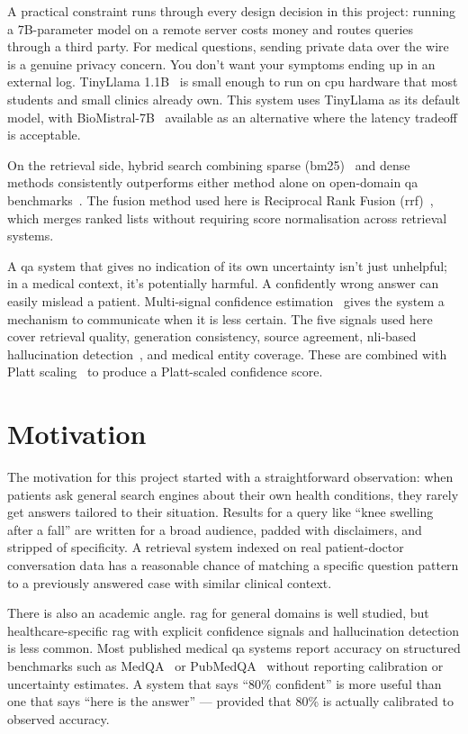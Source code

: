 A practical constraint runs through every design decision in this project: running a 7B-parameter model on a remote server costs money and routes queries through a third party. For medical questions, sending private data over the wire is a genuine privacy concern. You don't want your symptoms ending up in an external log. TinyLlama 1.1B~\cite{zhang2024tinyllama} is small enough to run on \ac{cpu} hardware that most students and small clinics already own. This system uses TinyLlama as its default model, with BioMistral-7B~\cite{labrak2024biomistral} available as an alternative where the latency tradeoff is acceptable.

On the retrieval side, hybrid search combining sparse (\ac{bm25})~\cite{robertson2009bm25} and dense~\cite{reimers2019sbert} methods consistently outperforms either method alone on open-domain \ac{qa} benchmarks~\cite{ma2022hybrid}. The fusion method used here is Reciprocal Rank Fusion (\ac{rrf})~\cite{cormack2009rrf}, which merges ranked lists without requiring score normalisation across retrieval systems.

A \ac{qa} system that gives no indication of its own uncertainty isn't just unhelpful; in a medical context, it's potentially harmful. A confidently wrong answer can easily mislead a patient. Multi-signal confidence estimation~\cite{guo2017calibration} gives the system a mechanism to communicate when it is less certain. The five signals used here cover retrieval quality, generation consistency, source agreement, \ac{nli}-based hallucination detection~\cite{he2021deberta}, and medical entity coverage. These are combined with Platt scaling~\cite{platt1999probabilistic} to produce a Platt-scaled confidence score.

\section{Motivation}

The motivation for this project started with a straightforward observation: when patients ask general search engines about their own health conditions, they rarely get answers tailored to their situation. Results for a query like ``knee swelling after a fall'' are written for a broad audience, padded with disclaimers, and stripped of specificity. A retrieval system indexed on real patient-doctor conversation data has a reasonable chance of matching a specific question pattern to a previously answered case with similar clinical context.

There is also an academic angle. \ac{rag} for general domains is well studied, but healthcare-specific \ac{rag} with explicit confidence signals and hallucination detection is less common. Most published medical \ac{qa} systems report accuracy on structured benchmarks such as MedQA~\cite{jin2021medqa} or PubMedQA~\cite{jin2019pubmedqa} without reporting calibration or uncertainty estimates. A system that says ``80\% confident'' is more useful than one that says ``here is the answer'' --- provided that 80\% is actually calibrated to observed accuracy.

